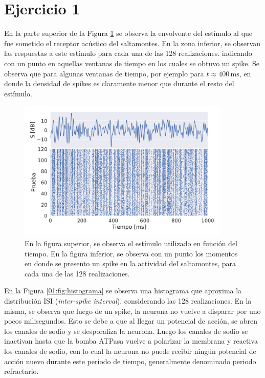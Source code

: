 \section*{Ejercicio 1}
\graphicspath{{Figuras/}}

En la parte superior de la Figura \ref{01:fig:rasterplot} se observa la envolvente del estímulo al que fue sometido el receptor acústico del saltamontes. En la zona inferior, se observan las respuestas a este estímulo para cada una de las 128 realizaciones. indicando con un punto en aquellas ventanas de tiempo en los cuales se obtuvo un spike. Se observa que para algunas ventanas de tiempo, por ejemplo para $t\approx 400\,\text{ms}$, en donde la densidad de spikes es claramente menor que durante el resto del estímulo.

\begin{figure}[h!]
    \centering
    \includegraphics[width=0.9\textwidth]{1_Rasterplot.pdf}
    \caption{En la figura superior, se observa el estímulo utilizado en función del tiempo. En la figura inferior, se observa con un punto los momentos en donde se presento un spike en la actividad del saltamontes, para cada una de las 128 realizaciones.}
    \label{01:fig:rasterplot}
\end{figure}

En la Figura \ref{01:fig:histograma} se observa una histograma que aproxima la distribución ISI (\textit{inter-spike interval}), considerando las 128 realizaciones. En la misma, se observa que luego de un spike, la neurona no vuelve a disparar por uno pocos milisegundos. Esto se debe a que al llegar un potencial de acción, se abren los canales de sodio y se desporaliza la neurona. Luego los canales de sodio se inactivan hasta que la bomba ATPasa vuelve a polarizar la membrana y reactiva los canales de sodio, con lo cual la neurona no puede recibir ningún potencial de acción nuevo durante este periodo de tiempo, generalmente denominado periodo refractario.



